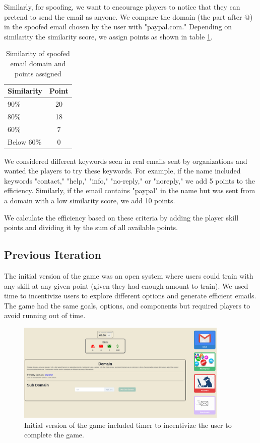Similarly, for spoofing, we want to encourage players to notice that they can pretend to send the email as anyone. We compare the domain (the part after @) in the spoofed email chosen by the user with "paypal.com." Depending on similarity the similarity score, we assign points as shown in table \ref{tab:similarity_spoofed}.

\begin{table}[!h]
    \centering
    \begin{tabular}{l c}
        \hline
        Similarity & Point \\
        \hline
        90\%       & 20    \\
        80\%       & 18    \\
        60\%       & 7     \\
        Below 60\% & 0     \\
        \hline
    \end{tabular}%
    \caption{Similarity of spoofed email domain and points assigned}
    \label{tab:similarity_spoofed}
\end{table}

We considered different keywords seen in real emails sent by organizations and wanted the players to try these keywords. For example, if the name included keywords "contact," "help," "info," "no-reply," or "noreply," we add 5 points to the efficiency. Similarly, if the email contains "paypal" in the name but was sent from a domain with a low similarity score, we add 10 points.

We calculate the efficiency based on these criteria by adding the player skill points and dividing it by the sum of all available points.

\subsection{Previous Iteration}
The initial version of the game was an open system where users could train with any skill at any given point (given they had enough amount to train). We used time to incentivize users to explore different options and generate efficient emails. The game had the same goals, options, and components but required players to avoid running out of time.

\begin{figure}[!ht]
    \centering
    \includegraphics[width=0.9\textwidth]{figures/section2/game_initial.png}
    \caption[Initial version of the game]{Initial version of the game included timer to incentivize the user to complete the game.}
\end{figure}

